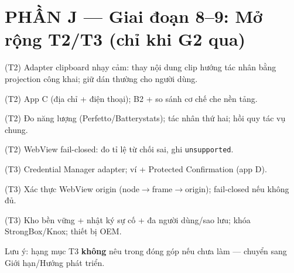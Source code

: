\documentclass[11pt,a4paper]{article}
\newcommand{\todo}{\textcolor{shgray}{$\square$}}
\newcommand{\code}[1]{\texttt{\small #1}}
\begin{document}
\section*{PHẦN J --- Giai đoạn 8--9: Mở rộng T2/T3 (chỉ khi G2 qua)}
\begin{chk}
\item[\todo] (T2) Adapter clipboard nhạy cảm: thay nội dung clip hướng tác nhân bằng projection công khai; giữ dán thường cho người dùng.
\item[\todo] (T2) App C (địa chỉ + điện thoại); B2 + so sánh cơ chế che nền tảng.
\item[\todo] (T2) Đo năng lượng (Perfetto/Batterystats); tác nhân thứ hai; hồi quy tác vụ chung.
\item[\todo] (T2) WebView fail-closed: đo tỉ lệ từ chối sai, ghi \code{unsupported}.
\item[\todo] (T3) Credential Manager adapter; ví + Protected Confirmation (app D).
\item[\todo] (T3) Xác thực WebView origin (node$\to$frame$\to$origin); fail-closed nếu không đủ.
\item[\todo] (T3) Kho bền vững + nhật ký sự cố + đa người dùng/sao lưu; khóa StrongBox/Knox; thiết bị OEM.
\item[\todo] Lưu ý: hạng mục T3 \textbf{không} nêu trong đóng góp nếu chưa làm --- chuyển sang Giới hạn/Hướng phát triển.
\end{chk}
\end{document}
